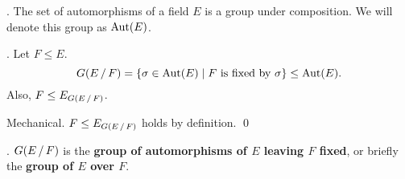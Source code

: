 \thm.  The set of automorphisms of a field \(E\) is a group under composition. We will denote this group as \(\mathrm{Aut}(E)\).

\thm. Let \(F \leq E\).
\[
    G(E \operatorname{/} F) = \{\sigma \in \mathrm{Aut}(E) \mid F \text{ is fixed by } \sigma\} \leq \mathrm{Aut}(E).
\]
Also, \(F \leq E_{G(E \operatorname{/} F)}\).

\pf Mechanical. \(F \leq E_{G(E \operatorname{/} F)}\) holds by definition. \qed

. \(G(E \operatorname{/} F)\) is the \textbf{group of automorphisms of \(E\) leaving \(F\) fixed}, or briefly the \textbf{group of \(E\) over \(F\)}.

\smallskip
